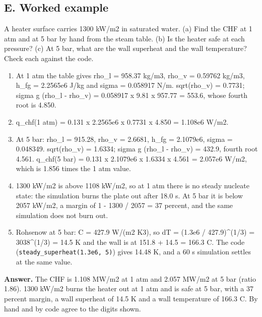 \documentclass[11pt,a4paper]{article}
\begin{document}
\subsection*{E. Worked example}
A heater surface carries 1300 kW/m2 in saturated water. (a) Find the CHF at 1 atm and at 5 bar by hand from the steam table. (b) Is the heater safe at each pressure? (c) At 5 bar, what are the wall superheat and the wall temperature? Check each against the code.
\begin{enumerate}[nosep]
\item At 1 atm the table gives rho\_l = 958.37 kg/m3, rho\_v = 0.59762 kg/m3, h\_fg = 2.2565e6 J/kg and sigma = 0.058917 N/m. sqrt(rho\_v) = 0.7731; sigma g (rho\_l - rho\_v) = 0.058917 x 9.81 x 957.77 = 553.6, whose fourth root is 4.850.
\item q\_chf(1 atm) = 0.131 x 2.2565e6 x 0.7731 x 4.850 = 1.108e6 W/m2.
\item At 5 bar: rho\_l = 915.28, rho\_v = 2.6681, h\_fg = 2.1079e6, sigma = 0.048349. sqrt(rho\_v) = 1.6334; sigma g (rho\_l - rho\_v) = 432.9, fourth root 4.561. q\_chf(5 bar) = 0.131 x 2.1079e6 x 1.6334 x 4.561 = 2.057e6 W/m2, which is 1.856 times the 1 atm value.
\item 1300 kW/m2 is above 1108 kW/m2, so at 1 atm there is no steady nucleate state: the simulation burns the plate out after 18.0 s. At 5 bar it is below 2057 kW/m2, a margin of 1 - 1300 / 2057 = 37 percent, and the same simulation does not burn out.
\item Rohsenow at 5 bar: C = 427.9 W/(m2 K3), so dT = (1.3e6 / 427.9)\textasciicircum{}(1/3) = 3038\textasciicircum{}(1/3) = 14.5 K and the wall is at 151.8 + 14.5 = 166.3 C. The code (\texttt{steady\_superheat(1.3e6, 5)}) gives 14.48 K, and a 60 s simulation settles at the same value.
\end{enumerate}
\textbf{Answer.} The CHF is 1.108 MW/m2 at 1 atm and 2.057 MW/m2 at 5 bar (ratio 1.86). 1300 kW/m2 burns the heater out at 1 atm and is safe at 5 bar, with a 37 percent margin, a wall superheat of 14.5 K and a wall temperature of 166.3 C. By hand and by code agree to the digits shown.
\end{document}
